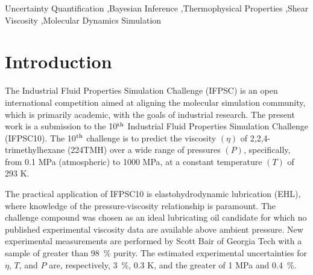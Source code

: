 \documentclass[preprint,review,12pt]{elsarticle}
\begin{document}
\begin{frontmatter}
\begin{abstract}
		\end{abstract}
		
		\begin{keyword}
			
			
			
			Uncertainty Quantification \sep Bayesian Inference \sep Thermophysical Properties \sep Shear Viscosity \sep Molecular Dynamics Simulation
			
		\end{keyword}
		
	\end{frontmatter}	
		
	\section{Introduction}
	
	The Industrial Fluid Properties Simulation Challenge (IFPSC) is an open international competition aimed at aligning the molecular simulation community, which is primarily academic, with the goals of industrial research. The present work is a submission to the 10$^{\rm th}$ Industrial Fluid Properties Simulation Challenge (IFPSC10). The 10$^{\rm th}$ challenge is to predict the viscosity $(\eta)$ of 2,2,4-trimethylhexane (224TMH) over a wide range of pressures $(P)$, specifically, from 0.1 MPa (atmospheric) to 1000 MPa, at a constant temperature $(T)$ of 293 K.
	
    The practical application of IFPSC10 is elastohydrodynamic lubrication (EHL), where knowledge of the pressure-viscosity relationship is paramount. The challenge compound was chosen as an ideal lubricating oil candidate for which no published experimental viscosity data are available above ambient pressure. New experimental measurements are performed by Scott Bair of Georgia Tech with a sample of greater than 98~\% purity. The estimated experimental uncertainties for $\eta$, $T$, and $P$ are, respectively, 3~\%, 0.3 K, and the greater of 1 MPa and 0.4~\%.
	
\end{document}
